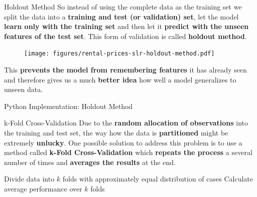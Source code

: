 \documentclass[document.tex]{subfiles}
\begin{document}
    \begin{frame}{Holdout Method}
            So instead of using the complete data as the training set we split the data into a \textbf{training and test (or validation) set}, let the model \textbf{learn only with the training set} and then let it \textbf{predict with the unseen features of the test set}. This form of validation is called \textbf{holdout method}.

            \begin{figure}
                \label{fig:rental-prices-slr-holdout-method}
                \texttt{[image: figures/rental-prices-slr-holdout-method.pdf]}
            \end{figure}
            
            This \textbf{prevents the model from remembering features} it has already seen and therefore gives us a much \textbf{better idea} how well a model generalizes to unseen data.
    \end{frame}

    \begin{frame}{Python Implementation: Holdout Method}
        
    \end{frame}
    
    \begin{frame}{k-Fold Cross-Validation}
        Due to the \textbf{random allocation of observations} into the training and test set, the way how the data is \textbf{partitioned} might be extremely \textbf{unlucky}. One possible solution to address this problem is to use a method called \textbf{k-Fold Cross-Validation} which \textbf{repeats the process} a several number of times and \textbf{averages the results} at the end.
        
        \begin{center}
            \begin{minipage}{.85\linewidth}
                \begin{algorithm}[H]
                    \DontPrintSemicolon
                    \caption{k-Fold Cross-Validation}
                    Divide data into $k$ folds with approximately equal distribution of cases\;
                    Calculate average performance over $k$ folds
                \end{algorithm}
            \end{minipage}
        \end{center}
    \end{frame}
\end{document}
